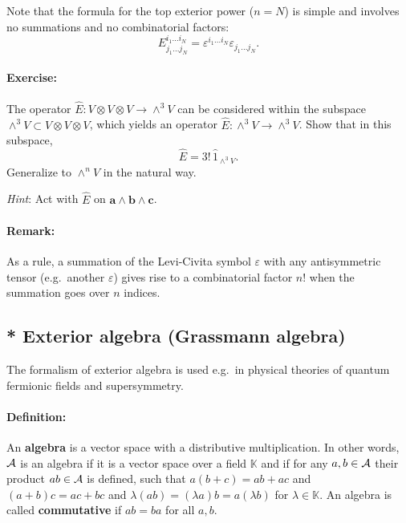 Note that the formula for the top exterior power ($n=N$) is simple
and involves no summations and no combinatorial factors:\[
E_{j_{1}...j_{N}}^{i_{1}...i_{N}}=\varepsilon^{i_{1}...i_{N}}\varepsilon_{j_{1}...j_{N}}.\]



\paragraph{Exercise:}

The operator $\hat{E}:V\otimes V\otimes V\rightarrow\wedge^{3}V$
can be considered within the subspace $\wedge^{3}V\subset V\otimes V\otimes V$,
which yields an operator $\hat{E}:\wedge^{3}V\rightarrow\wedge^{3}V$.
Show that in this subspace,\[
\hat{E}=3!\,\hat{1}_{\wedge^{3}V}.\]
Generalize to $\wedge^{n}V$ in the natural way. 

\emph{Hint}: Act with $\hat{E}$ on $\mathbf{a}\wedge\mathbf{b}\wedge\mathbf{c}$.


\paragraph{Remark:}

As a rule, a summation of the Levi-Civita symbol $\varepsilon$ with
any antisymmetric tensor (e.g.~another $\varepsilon$) gives rise
to a combinatorial factor $n!$ when the summation goes over $n$
indices.


\subsection{{*} Exterior algebra (Grassmann algebra)}

The formalism of exterior algebra is used e.g.~in physical theories
of quantum fermionic fields and supersymmetry.


\paragraph{Definition:}

An \textbf{algebra} is a vector space with a distributive
multiplication. In other words, ${\cal A}$ is an algebra if it is
a vector space over a field $\mathbb{K}$ and if for any $a,b\in{\cal A}$
their product $ab\in{\cal A}$ is defined, such that $a\left(b+c\right)=ab+ac$
and $\left(a+b\right)c=ac+bc$ and $\lambda\left(ab\right)=\left(\lambda a\right)b=a\left(\lambda b\right)$
for $\lambda\in\mathbb{K}$. An algebra is called \textbf{commutative}
if $ab=ba$ for all $a,b$. 


